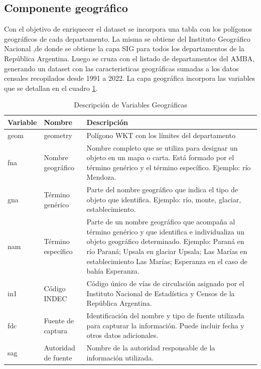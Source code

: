 \documentclass{article}
\theoremstyle{mytheoremstyle}
\theoremstyle{mytheoremstyle}
\theoremstyle{myproblemstyle}
\begin{document}
\subsection{Componente geográfico }
Con el objetivo de enriquecer el dataset se incorpora una tabla con los polígonos geográficos de cada departamento.
 La misma se obtiene del Instituto Geográfico Nacional ,de donde se obtiene la capa SIG para 
 todos los departamentos de la República Argentina. Luego se cruza con el listado de departamentos del AMBA,
 generando un dataset con las caracteristicas geográficas sumadas a los datos censales recopilados desde 1991 a 2022. La capa geográfica
 incorpora las variables que se detallan en el cuadro \ref{tab:geo.depto}.
\begin{table}[htbp]
    \centering
    \caption{Descripción de Variables Geográficas}
    \begin{tabular}{|l|l|p{8cm}|}
        \hline
        \textbf{Variable} & \textbf{Nombre} & \textbf{Descripción} \\
        \hline
        geom & geometry & Polígono WKT con los límites del departamento \\
        fna & Nombre geográfico & Nombre completo que se utiliza para designar un objeto en un mapa o carta. Está formado por el término genérico y el término específico. Ejemplo: río Mendoza. \\
        gna & Término genérico & Parte del nombre geográfico que indica el tipo de objeto que identifica. Ejemplo: río, monte, glaciar, establecimiento. \\
        nam & Término específico & Parte de un nombre geográfico que acompaña al término genérico y que identifica e individualiza un objeto geográfico determinado. Ejemplo: Paraná en río Paraná; Upsala en glaciar Upsala; Las Marías en establecimiento Las Marías; Esperanza en el caso de bahía Esperanza. \\
        in1 & Código INDEC & Código único de vías de circulación asignado por el Instituto Nacional de Estadística y Censos de la República Argentina. \\
        fdc & Fuente de captura & Identificación del nombre y tipo de fuente utilizada para capturar la información. Puede incluir fecha y otros datos adicionales. \\
        sag & Autoridad de fuente & Nombre de la autoridad responsable de la información utilizada. \\
        \hline
    \end{tabular}
    \label{tab:geo.depto}
\end{table}
\end{document}
